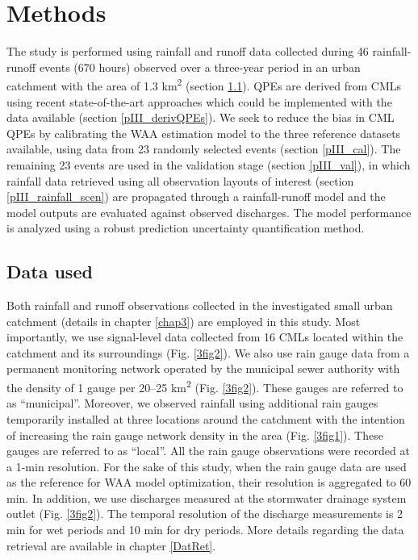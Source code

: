 \documentclass{ctuthesis}\usepackage[]{graphicx}\usepackage[]{color}
\begin{document}
\section{Methods} \label{paperIIIMnM}

The study is performed using rainfall and runoff data collected during 46 rainfall-runoff events (670 hours) observed over a three-year period in an urban catchment with the area of 1.3 km\textsuperscript{2} (section \ref{dataAcq}). QPEs are derived from CMLs using recent state-of-the-art approaches which could be implemented with the data available (section \ref{pIII_derivQPEs}). We seek to reduce the bias in CML QPEs by calibrating the WAA estimation model to the three reference datasets available, using data from 23 randomly selected events (section \ref{pIII_cal}). The remaining 23 events are used in the validation stage (section \ref{pIII_val}), in which rainfall data retrieved using all observation layouts of interest (section \ref{pIII_rainfall_scen}) are propagated through a rainfall-runoff model and the model outputs are evaluated against observed discharges. The model performance is analyzed using a robust prediction uncertainty quantification method.


\subsection{Data used} \label{dataAcq}
Both rainfall and runoff observations collected in the investigated small urban catchment (details in chapter \ref{chap3}) are employed in this study. Most importantly, we use signal-level data collected from 16 CMLs located within the catchment and its surroundings (Fig. \ref{3fig2}). We also use rain gauge data from a permanent monitoring network operated by the municipal sewer authority with the density of 1 gauge per 20–25 km\textsuperscript{2} (Fig. \ref{3fig2}). These gauges are referred to as “municipal”. Moreover, we observed rainfall using additional rain gauges temporarily installed at three locations around the catchment with the intention of increasing the rain gauge network density in the area (Fig. \ref{3fig1}). These gauges are referred to as “local”. All the rain gauge observations were recorded at a 1-min resolution. For the sake of this study, when the rain gauge data are used as the reference for WAA model optimization, their resolution is aggregated to 60 min. In addition, we use discharges measured at the stormwater drainage system outlet (Fig. \ref{3fig2}). The temporal resolution of the discharge measurements is 2 min for wet periods and 10 min for dry periods. More details regarding the data retrieval are available in chapter \ref{DatRet}.
\end{document}
